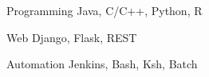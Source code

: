 

\begin{cvskills}

  \cvskill
    {Programming} %
    {Java, C/C++, Python, R} %

  \cvskill
    {Web} %
    {Django, Flask, REST} %
    
  \cvskill
    {Automation}
    {Jenkins, Bash, Ksh, Batch}

\end{cvskills}